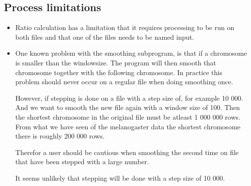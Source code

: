 \subsection{Process limitations}
\begin{itemize} 
\item Ratio calculation has a limitation that it requires processing to be run on both files and that one of the files needs to be named input.

\item One known problem with the smoothing subprogram, is that if a chromosome is smaller 
than the windowsize. The program will then smooth that chromosome together with 
the following chromosome. In practice this problem should never occur on a regular
file when doing smoothing once. 

However, if stepping is done on a file with a step size of, for example 10 000.
And we want to smooth the new file again with a window size of 100. Then the shortest
chromosome in the original file must be atleast 1 000 000 rows. From what we have seen
of the melanogaster data the shortest chromosome there is roughly 200 000 rows. 

Therefor a user should be cautious when smoothing the second time 
on file that have been stepped with a large number. 

It seems unlikely that stepping will be done with a step size of 10 000.  
\end{itemize}
